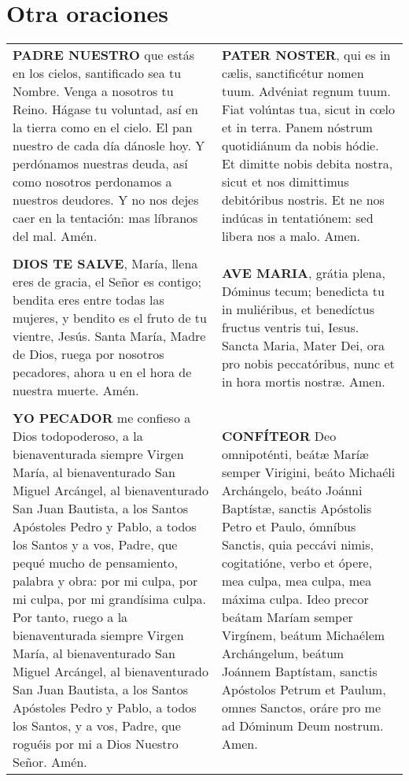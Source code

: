 \documentclass[./rosary.tex]{subfiles}
\begin{document}
\chapter*{Otra oraciones}

\begin{longtable} { p{} p{} }
    \label{ourFather}
    \textbf{PADRE NUESTRO} que estás en los cielos, santificado sea tu Nombre. Venga a nosotros tu Reino.
    Hágase tu voluntad, así en la tierra como en el cielo. El pan nuestro de cada día dánosle hoy.
    Y perdónamos nuestras deuda, así como nosotros perdonamos a nuestros deudores.
    Y no nos dejes caer en la tentación: mas líbranos del mal. Amén.

        &

    \textbf{PATER NOSTER}, qui es in cælis, sanctificétur nomen tuum. Advéniat regnum tuum.
    Fiat volúntas tua, sicut in cœlo et in terra. Panem nóstrum quotidiánum da nobis hódie.
    Et dimitte nobis debita nostra, sicut et nos dimittimus debitóribus nostris.
    Et ne nos indúcas in tentatiónem: sed libera nos a malo. Amen.\\\\

    \label{hailMary}
    \textbf{DIOS TE SALVE}, María, llena eres de gracia, el Señor es contigo; bendita eres entre todas las mujeres,
    y bendito es el fruto de tu vientre, Jesús. Santa María, Madre de Dios, ruega por nosotros pecadores,
    ahora u en el hora de nuestra muerte. Amén.

        &

    \textbf{AVE MARIA}, grátia plena, Dóminus tecum; benedicta tu in muliéribus, et benedíctus fructus ventris tui,
    Iesus. Sancta Maria, Mater Dei, ora pro nobis peccatóribus, nunc et in hora mortis nostræ. Amen.\\\\

    \label{iConfess}
    \textbf{YO PECADOR} me confieso a Dios todopoderoso, a la bienaventurada siempre Virgen María, al bienaventurado San Miguel Arcángel,
    al bienaventurado San Juan Bautista, a los Santos Apóstoles Pedro y Pablo, a todos los Santos y a vos, Padre, que pequé mucho
    de pensamiento, palabra y obra: por mi culpa, por mi culpa, por mi grandísima culpa. Por tanto, ruego a la bienaventurada
    siempre Virgen María, al bienaventurado San Miguel Arcángel, al bienaventurado San Juan Bautista, a los Santos Apóstoles
    Pedro y Pablo, a todos los Santos, y a vos, Padre, que roguéis por mi a Dios Nuestro Señor. Amén.
    
        &

    \textbf{CONFÍTEOR} Deo omnipoténti, beátæ Maríæ semper Virigini, beáto Michaéli Archángelo, beáto Joánni Baptístæ, sanctis Apóstolis Petro et Paulo,
    ómníbus Sanctis, quia peccávi nimis, cogitatióne, verbo et ópere, mea culpa, mea culpa, mea máxima culpa. Ideo precor beátam
    Maríam semper Virgínem, beátum Michaélem Archángelum, beátum Joánnem Baptístam, sanctis Apóstolos Petrum et Paulum, omnes Sanctos,
    oráre pro me ad Dóminum Deum nostrum. Amen.
\end{longtable}
\end{document}
